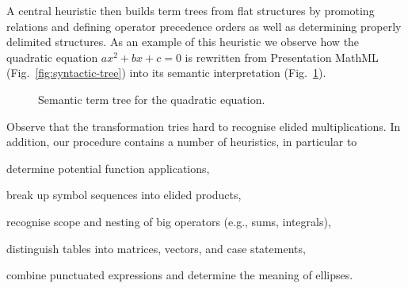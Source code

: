 \documentclass[conference]{IEEEtran}
\begin{document}
A central heuristic then builds term trees from flat structures by promoting
relations and defining operator precedence orders as well as determining
properly delimited structures.  As an example of this heuristic we observe how
the quadratic equation $ax^2 + bx + c = 0$ is rewritten from Presentation
MathML (Fig.~\ref{fig:syntactic-tree}) into its semantic
interpretation (Fig.~\ref{fig:semantic-tree}).

\begin{figure}[t]
  \centering
{}
  \caption{Semantic term tree for the quadratic equation.}
  \label{fig:semantic-tree}
\end{figure}

Observe that the transformation tries hard to recognise elided multiplications.
In addition, our procedure contains a number of heuristics, in particular to
\begin{inparaenum}[(1)]
 \item determine potential function applications,
 \item break up symbol sequences into elided products,
 \item recognise scope and nesting of big operators (e.g., sums, integrals),
 \item distinguish tables into matrices, vectors, and case statements,
 \item combine punctuated expressions and determine the meaning of ellipses.
\end{inparaenum}
\end{document}
